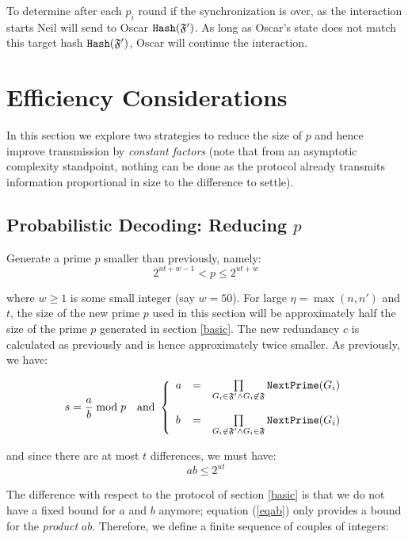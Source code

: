 \documentclass[11pt]{llncs}
\begin{document}
To determine after each $p_i$ round if the synchronization is over, as the interaction starts Neil will send to Oscar $\mbox{{\tt Hash}}(\mathfrak{F}')$. As long as Oscar's state does not match this target hash $\mbox{{\tt Hash}}(\mathfrak{F}')$, Oscar will continue the interaction.

\section{Efficiency Considerations}

In this section we explore two strategies to reduce the size of $p$ and hence improve transmission by {\sl constant factors} (note that from an asymptotic complexity standpoint, nothing can be done as the protocol already transmits information proportional in size to the difference to settle).

\subsection{Probabilistic Decoding: Reducing $p$}

Generate a prime $p$ smaller than previously, namely:
\begin{equation}
\label{eqnewp}
2^{ut+w-1}<p \leq 2^{ut+w}
\end{equation}

where $w \geq 1$ is some small integer (say $w=50$). For large $\eta=\max(n,n')$ and $t$, the size of the new prime $p$ used in this section will be approximately half the size of the prime $p$ generated in section \ref{basic}. The new redundancy $c$ is calculated as previously and is hence approximately twice smaller. As previously, we have:

$$
s=\frac{a}{b} \bmod p{~~~\mbox{and~}}
\left\{
\begin{array}{lcr}
a & =&  \prod\limits_{G_i \in \mathfrak{F}'\wedge G_i \not\in\mathfrak{F}} \mbox{{\tt NextPrime}}(G_i) \\
\\
b & = & \prod\limits_{G_i \not\in\mathfrak{F}' \wedge G_i \in\mathfrak{F}} \mbox{{\tt NextPrime}}(G_i)
\end{array}
\right.
$$

and since there are at most $t$ differences, we must have:
\begin{equation}
\label{eqab}
a b \leq 2^{ut}
\end{equation}

The difference with respect to the protocol of section \ref{basic} is that we do not have a fixed bound for $a$ and $b$ anymore; equation (\ref{eqab}) only provides a bound for the {\sl product} $a b$. Therefore, we define a finite sequence of couples of integers:
\end{document}
